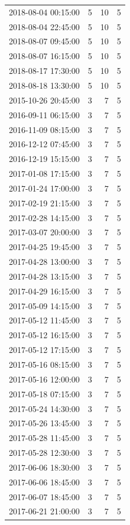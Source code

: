 \begin{tabular}{lrrr}
2018-08-04 00:15:00 & 5 & 10 & 5 \\
2018-08-04 22:45:00 & 5 & 10 & 5 \\
2018-08-07 09:45:00 & 5 & 10 & 5 \\
2018-08-07 16:15:00 & 5 & 10 & 5 \\
2018-08-17 17:30:00 & 5 & 10 & 5 \\
2018-08-18 13:30:00 & 5 & 10 & 5 \\
2015-10-26 20:45:00 & 3 & 7 & 5 \\
2016-09-11 06:15:00 & 3 & 7 & 5 \\
2016-11-09 08:15:00 & 3 & 7 & 5 \\
2016-12-12 07:45:00 & 3 & 7 & 5 \\
2016-12-19 15:15:00 & 3 & 7 & 5 \\
2017-01-08 17:15:00 & 3 & 7 & 5 \\
2017-01-24 17:00:00 & 3 & 7 & 5 \\
2017-02-19 21:15:00 & 3 & 7 & 5 \\
2017-02-28 14:15:00 & 3 & 7 & 5 \\
2017-03-07 20:00:00 & 3 & 7 & 5 \\
2017-04-25 19:45:00 & 3 & 7 & 5 \\
2017-04-28 13:00:00 & 3 & 7 & 5 \\
2017-04-28 13:15:00 & 3 & 7 & 5 \\
2017-04-29 16:15:00 & 3 & 7 & 5 \\
2017-05-09 14:15:00 & 3 & 7 & 5 \\
2017-05-12 11:45:00 & 3 & 7 & 5 \\
2017-05-12 16:15:00 & 3 & 7 & 5 \\
2017-05-12 17:15:00 & 3 & 7 & 5 \\
2017-05-16 08:15:00 & 3 & 7 & 5 \\
2017-05-16 12:00:00 & 3 & 7 & 5 \\
2017-05-18 07:15:00 & 3 & 7 & 5 \\
2017-05-24 14:30:00 & 3 & 7 & 5 \\
2017-05-26 13:45:00 & 3 & 7 & 5 \\
2017-05-28 11:45:00 & 3 & 7 & 5 \\
2017-05-28 12:30:00 & 3 & 7 & 5 \\
2017-06-06 18:30:00 & 3 & 7 & 5 \\
2017-06-06 18:45:00 & 3 & 7 & 5 \\
2017-06-07 18:45:00 & 3 & 7 & 5 \\
2017-06-21 21:00:00 & 3 & 7 & 5 \\

\end{tabular}
